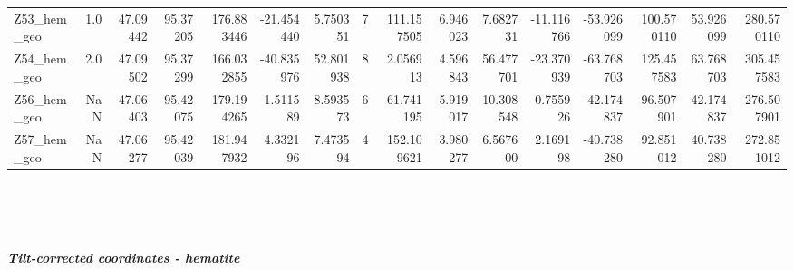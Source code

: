 \documentclass[11pt]{article}
\begin{document}
\begin{sidewaystable}
{\begin{tabular}{lrrrrrrrrrrrrrrr}
Z53\_hem\_geo &        1.0 &  47.09442 &  95.37205 &  176.883446 & -21.454440 &   5.750351 &  7 &  111.157505 &  6.946023 &   7.682731 &     -11.116766 & -53.926099 &  100.570110 &    53.926099 &   280.570110 \\
Z54\_hem\_geo &        2.0 &  47.09502 &  95.37299 &  166.032855 & -40.835976 &  52.801938 &  8 &    2.056913 &  4.596843 &  56.477701 &     -23.370939 & -63.768703 &  125.457583 &    63.768703 &   305.457583 \\
Z56\_hem\_geo &        NaN &  47.06403 &  95.42075 &  179.194265 &   1.511589 &   8.593573 &  6 &   61.741195 &  5.919017 &  10.308548 &       0.755926 & -42.174837 &   96.507901 &    42.174837 &   276.507901 \\
Z57\_hem\_geo &        NaN &  47.06277 &  95.42039 &  181.947932 &   4.332196 &   7.473594 &  4 &  152.109621 &  3.980277 &   6.567600 &       2.169198 & -40.738280 &   92.851012 &    40.738280 &   272.851012 \\
\bottomrule
\end{tabular}}
\end{sidewaystable}
    


    \begin{center}
    \end{center}
    { \hspace*{\fill} \\}
    

    \begin{center}
    \end{center}
    { \hspace*{\fill} \\}
    
    \subparagraph{Tilt-corrected coordinates -
hematite}\label{tilt-corrected-coordinates---hematite}
\end{document}
